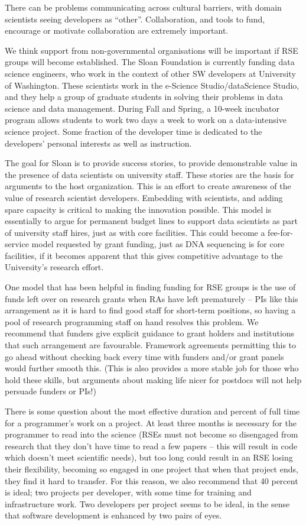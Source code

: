 There can be problems communicating across cultural barriers, with domain
scientists seeing developers as “other”.
Collaboration, and tools to fund, encourage or motivate collaboration are
extremely important.

We think support from non-governmental organisations will be important if RSE
groups will become established.
The Sloan Foundation is currently funding data science engineers, who work in
the context of other SW developers at University of Washington.
These scientists work in the e-Science Studio/dataScience Studio, and they
help a group of graduate students in solving their problems in data
science and data management. During Fall and Spring, a 10-week incubator program
allows students to work two days a week to work on a data-intensive science
project. Some fraction of the developer time is dedicated to the developers'
personal interests as well as instruction.

The goal for Sloan is to provide success stories, to provide demonstrable value
in the presence of data scientists on university staff. These stories are the
basis for arguments to the host organization. This is an effort to create
awareness of the value of research scientist developers. Embedding with
scientists, and adding spare capacity is critical to making the innovation
possible. This model is essentially to argue for permanent budget lines to
support data scientists as part of university staff hires, just as with core
facilities. This could become a fee-for-service model requested by grant
funding, just as DNA sequencing is for core facilities, if it becomes apparent
that this gives competitive advantage to the University’s research effort.

One model that has been helpful in finding funding for RSE groups is the use of
funds left over on research grants when RAs have left prematurely -- PIs like
this arrangement as it is hard to find good staff for short-term positions, so
having a pool of research programming staff on hand resolves this problem.
We recommend that funders give explicit guidance to grant holders and
institutions that such arrangement are favourable. Framework agreements
permitting this to go ahead without
checking back every time with funders and/or grant panels would further
smooth this.
(This is also provides a more stable job for those who hold these skills, but
arguments about making life nicer for postdocs will not help persuade funders
or PIs!)

There is some question about the most effective
duration and percent of full time for a programmer's work on a project.
At least three months is necessary for the programmer to read into the science
(RSEs must not become so disengaged from research that they don't have time to
read a few papers -- this will result in code which doesn't meet scientific
needs), but too long could result in an RSE losing their flexibility, becoming
so engaged in one project that when that project ends, they find it hard to
transfer. For this reason, we also recommend that 40 percent is ideal;
two projects per developer, with some time for training and infrastructure work.
Two developers per project seems to be ideal, in the sense that software
development is enhanced by two pairs of eyes.

